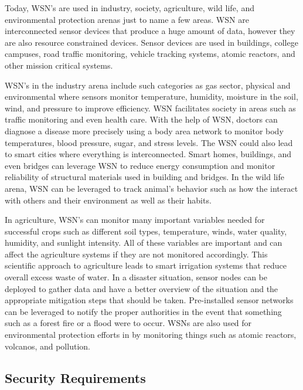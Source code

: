 Today, WSN’s are used in industry, society, agriculture, wild life, and environmental protection arenas just to name a few areas. WSN are interconnected sensor devices that produce a huge amount of data, however they are also resource constrained devices. Sensor devices are used in buildings, college campuses, road traffic monitoring, vehicle tracking systems, atomic reactors, and other mission critical systems. 

\smallskip

WSN’s in the industry arena include such categories as gas sector, physical and environmental where sensors monitor temperature, humidity, moisture in the soil, wind, and pressure to improve efficiency. WSN facilitates society in areas such as traffic monitoring and even health care. With the help of WSN, doctors can diagnose a disease more precisely using a body area network to monitor body temperatures, blood pressure, sugar, and stress levels. The WSN could also lead to smart cities where everything is interconnected. Smart homes, buildings, and even bridges can leverage WSN to reduce energy consumption and monitor reliability of structural materials used in building and bridges. In the wild life arena, WSN can be leveraged to track animal’s behavior such as how the interact with others and their environment as well as their habits. \cite {bangash2017security}

\smallskip

In agriculture, WSN’s can monitor many important variables needed for successful crops such as different soil types, temperature, winds, water quality, humidity, and sunlight intensity. All of these variables are important and can affect the agriculture systems if they are not monitored accordingly. This scientific approach to agriculture leads to smart irrigation systems that reduce overall excess waste of water. In a disaster situation, sensor nodes can be deployed to gather data and have a better overview of the situation and the appropriate mitigation steps that should be taken. Pre-installed sensor networks can be leveraged to notify the proper authorities in the event that something such as a forest fire or a flood were to occur. WSNs are also used for environmental protection efforts in by monitoring things such as atomic reactors, volcanos, and pollution. \cite {bangash2017security}

\subsection {Security Requirements} 
\smallskip

